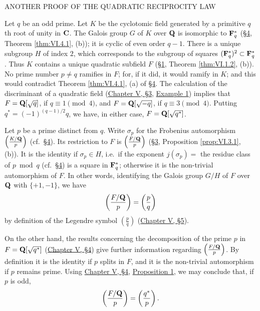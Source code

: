 %
        {ANOTHER PROOF OF THE QUADRATIC RECIPROCITY LAW}

Let $q$ be an odd prime. Let $K$ be the cyclotomic field generated by a
primitive $q$th root of unity in $\mathbf{C}$. The Galois group $G$ of $K$ over
$\mathbf{Q}$ is isomorphic to $\mathbf{F}_{q}^{*}$ (\hyperref[sec:6.4]{§4}, Theorem \ref{thm:VI.4.1}, (b));
it is cyclic of even order $q-1$. There is a unique subgroup $H$ of index
$2$, which corresponds to the subgroup of squares
$(\mathbf{F}_{q}^{*})^{2}\subset\mathbf{F}_{q}^{*}$. Thus $K$ contains a unique quadratic
subfield $F$ (\hyperref[sec:6.1]{§1}, Theorem \ref{thm:VI.1.2}, (b)). No prime number $p\neq
q$ ramifies in $F$; for, if it did, it would ramify in $K$; and this would
contradict Theorem \ref{thm:VI.4.1}, (a) of \hyperref[sec:6.4]{§4}. The calculation of the
discriminant of a quadratic field (\hyperref[sec:5.3]{Chapter V, §3}, \hyperref[exa:V.3.1]{Example 1}) implies that
$F=\mathbf{Q}[\sqrt{q}]$, if $q\equiv1\pmod4$, and $F=\mathbf{Q}[\sqrt{-q}]$, if
$q\equiv3\pmod4$. Putting $q^{*}=(-1)^{(q-1)/2}q$, we have, in either
case, $F=\mathbf{Q}[\sqrt{q^{*}}]$.

Let $p$ be a prime distinct from $q$. Write $\sigma_{p}$ for the
Frobenius automorphism
$\left(\frac{K/\mathbf{Q}}{p}\right)$ (cf.\ \hyperref[sec:6.4]{§4}). Its restriction to $F$ is
$\left(\frac{F/\mathbf{Q}}{p}\right)$ (\hyperref[sec:6.3]{§3}, Proposition \ref{prop:VI.3.1}, (b)).
It is the identity if $\sigma_{p}\in H$, i.e.\ if the exponent
$j(\sigma_{p})=$ the residue class of $p\bmod q$ (cf.\ \hyperref[sec:6.4]{§4}) is a square in
$\mathbf{F}_{q}^{*}$; otherwise it is the non-trivial automorphism of $F$. In
other words, identifying the Galois group $G/H$ of $F$ over $\mathbf{Q}$ with
$\{+1,-1\}$, we have
\begin{equation}
\left(\frac{F/\mathbf{Q}}{p}\right)=\left(\frac{p}{q}\right)
\label{eq:VI.5.1}
\end{equation}
by definition of the Legendre symbol $\left(\frac{p}{q}\right)$
(\hyperref[sec:5.5]{Chapter V, §5}).

On the other hand, the results concerning the decomposition of the prime
$p$ in $F=\mathbf{Q}[\sqrt{q^{*}}]$ (\hyperref[sec:5.4]{Chapter V, §4}) give further information
regarding $\left(\frac{F/\mathbf{Q}}{p}\right)$. By definition it is the identity
if $p$ splits in $F$, and it is the non-trivial automorphism if $p$
remains prime. Using \hyperref[sec:5.4]{Chapter V, §4}, \hyperref[prop:V.4.1]{Proposition 1}, we may conclude that,
if $p$ is odd,
\begin{equation}
\left(\frac{F/\mathbf{Q}}{p}\right)=\left(\frac{q^{*}}{p}\right).
\label{eq:VI.5.2}
\end{equation}

